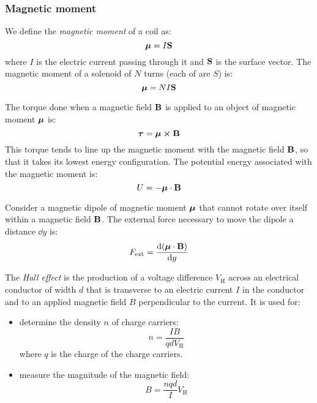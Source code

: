 \documentclass[../../../main.tex]{subfiles}
\begin{document}
\begin{multicols}{2}
  \subsubsection{Magnetic moment}
  \begin{definition}
    We define the \textit{magnetic moment} of a coil as: $$\boldsymbol{\mathrm{\mu}}=I\boldsymbol{\mathrm{S}}$$ where $I$ is the electric current passing through it and $\boldsymbol{\mathrm{S}}$ is the surface vector. The magnetic moment of a solenoid of $N$ turns (each of are $S$) is: $$\boldsymbol{\mathrm{\mu}}=NI\boldsymbol{\mathrm{S}}$$
  \end{definition}
  \begin{prop}
    The torque done when a magnetic field $\boldsymbol{\mathrm{B}}$ is applied to an object of magnetic moment $\boldsymbol{\mathrm{\mu}}$ is: $$\vectorfunction{\tau}=\vectorfunction{\mu}\crossprod\vectorfunction{B}$$ This torque tends to line up the magnetic moment with the magnetic field $\boldsymbol{\mathrm{B}}$, so that it takes its lowest energy configuration. The potential energy associated with the magnetic moment is: $$U=-\boldsymbol{\mathrm{\mu}}\cdot\boldsymbol{\mathrm{B}}$$
  \end{prop}
  \begin{prop}
    Consider a magnetic dipole of magnetic moment $\boldsymbol{\mathrm{\mu}}$ that cannot rotate over itself within a magnetic field $\boldsymbol{\mathrm{B}}$. The external force necessary to move the dipole a distance $\dd y$ is: $$F_\text{ext}=\dv{(\boldsymbol{\mathrm{\mu}}\cdot\boldsymbol{\mathrm{B}})}{y}$$
  \end{prop}
  \begin{prop}
    The \textit{Hall effect} is the production of a voltage difference $V_\text{H}$ across an electrical conductor of width $d$ that is transverse to an electric current $I$ in the conductor and to an applied magnetic field $B$ perpendicular to the current.
    It is used for:
    \begin{itemize}
      \item determine the density $n$ of charge carriers: $$n=\frac{IB}{qdV_\text{H}}$$ where $q$ is the charge of the charge carriers.
      \item measure the magnitude of the magnetic field: $$B=\frac{nqd}{I}V_\text{H}$$
    \end{itemize}
  \end{prop}
  \begin{center}
    \begin{minipage}{\linewidth}
      \centering
      
    \end{minipage}
  \end{center}

\end{multicols}
\end{document}
